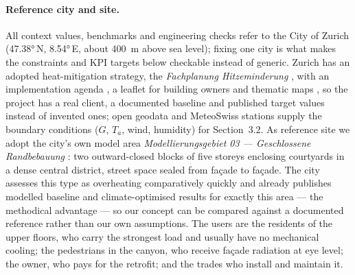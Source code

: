 \paragraph{Reference city and site.} All context values, benchmarks and
engineering checks refer to the City of Zurich (\ang{47.38}\,N, \ang{8.54}\,E,
about \qty{400}{\metre} above sea level); fixing one city is what makes the
constraints and KPI targets below checkable instead of generic. Zurich has an
adopted heat-mitigation strategy, the \emph{Fachplanung Hitzeminderung}
\parencite{stadtzuerich2020}, with an implementation agenda
\parencite{stadtzuerich_agenda}, a leaflet for building owners
\parencite{stadtzuerich_merkblatt} and thematic maps
\parencite{stadtzuerich_teilplaene}, so the project has a real client, a
documented baseline and published target values instead of invented ones; open
geodata \parencite{stadtzuerich_opendata} and MeteoSwiss stations
\parencite{meteoswiss} supply the boundary conditions ($G$, $T_a$, wind,
humidity) for Section~3.2. As reference site we adopt the city's own model area
\emph{Modellierungsgebiet 03 --- Geschlossene Randbebauung}
\parencite[148--151]{stadtzuerich2020}: two outward-closed blocks of five
storeys enclosing courtyards in a dense central district, street space sealed
from façade to façade. The city assesses this type as overheating comparatively
quickly and already publishes modelled baseline and climate-optimised results
for exactly this area --- the methodical advantage --- so our concept can be
compared against a documented reference rather than our own assumptions.
 The users are the residents of the upper floors, who carry
the strongest load and usually have no mechanical cooling; the pedestrians in
the canyon, who receive façade radiation at eye level; the owner, who pays for the retrofit; and
the trades who install and maintain it.

